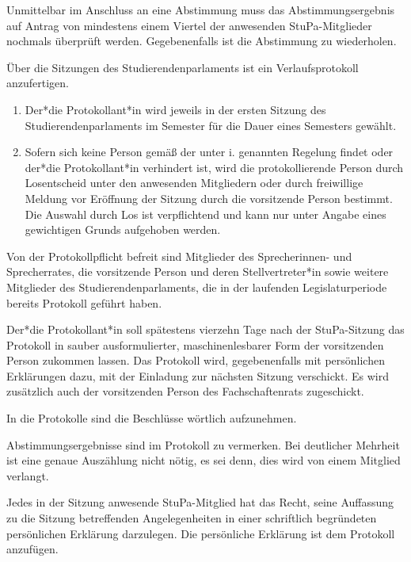 \documentclass[10pt,a4paper]{scrartcl}
\begin{document}
\begin{contract}
Unmittelbar im Anschluss an eine Abstimmung muss das
Abstimmungsergebnis auf Antrag von mindestens einem Viertel der
anwesenden StuPa-Mitglieder nochmals überprüft werden.
Gegebenenfalls ist die Abstimmung zu wiederholen.



\label{protokoll}

Über die Sitzungen des Studierendenparlaments ist ein
Verlaufsprotokoll anzufertigen.


\begin{enumerate}
\item
  Der*die Protokollant*in wird jeweils in der ersten Sitzung des
  Studierendenparlaments im Semester für die Dauer eines Semesters
  gewählt.
\item
  Sofern sich keine Person gemäß der unter i. genannten Regelung findet
  oder der*die Protokollant*in verhindert ist, wird die protokollierende
  Person durch Losentscheid unter den anwesenden Mitgliedern oder durch
  freiwillige Meldung vor Eröffnung der Sitzung durch die vorsitzende
  Person bestimmt. Die Auswahl durch Los ist verpflichtend und kann nur
  unter Angabe eines gewichtigen Grunds aufgehoben werden.
\end{enumerate}

Von der Protokollpflicht befreit sind Mitglieder des Sprecherinnen-
und Sprecherrates, die vorsitzende Person und deren Stellvertreter*in
sowie weitere Mitglieder des Studierendenparlaments, die in der
laufenden Legislaturperiode bereits Protokoll geführt haben.

Der*die Protokollant*in soll spätestens vierzehn Tage nach der
StuPa-Sitzung das Protokoll in sauber ausformulierter,
maschinenlesbarer Form der vorsitzenden Person zukommen lassen. Das
Protokoll wird, gegebenenfalls mit persönlichen Erklärungen dazu, mit
der Einladung zur nächsten Sitzung verschickt. Es wird zusätzlich auch
der vorsitzenden Person des Fachschaftenrats zugeschickt.

In die Protokolle sind die Beschlüsse wörtlich aufzunehmen.

Abstimmungsergebnisse sind im Protokoll zu vermerken. Bei deutlicher
Mehrheit ist eine genaue Auszählung nicht nötig, es sei denn, dies
wird von einem Mitglied verlangt.

Jedes in der Sitzung anwesende StuPa-Mitglied hat das Recht, seine
Auffassung zu die Sitzung betreffenden Angelegenheiten in einer
schriftlich begründeten persönlichen Erklärung darzulegen. Die
persönliche Erklärung ist dem Protokoll anzufügen.


\end{contract}
\end{document}
